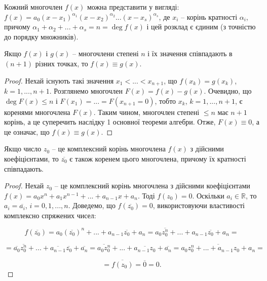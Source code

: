 \begin{corollary}
	Кожний многочлен $f(x)$ можна представити у вигляді:
	$f(x) = a_0(x-x_1)^{\alpha_1}(x-x_2)^{\alpha_2}...(x-x_s)^{\alpha_s}$,
	де $x_i$ -- корінь кратності $\alpha_i$, причому $\alpha_1 + \alpha_2 + ... + \alpha_s = n = \deg f(x)$ і цей розклад
	є єдиним (з точністю до порядку множників).
\end{corollary}

\begin{corollary}
	Якщо $f(x)$ і $g(x)$ -- многочлени степені $n$ і їх значення
	співпадають в $(n+1)$ різних точках, то $f(x) \equiv g(x)$.
\end{corollary}
\begin{proof}
	Нехай існують такі значення $x_1 < ... < x_{n+1}$, що $f(x_k) = g(x_k)$,
	$k = 1, ..., n+1$. Розглянемо многочлен $F(x) = f(x) - g(x)$. Очевидно, що
	$\deg F(x) \leqslant n$ і $F(x_1) = ... = F(x_{n+1} = 0)$, тобто $x_k$, $k = 1, ..., n+1$, є коренями
	многочлена $F(x)$. Таким чином, многочлен степені $\leqslant n$ має $n+1$ корінь, а це
	суперечить наслідку 1 основної теореми алгебри. Отже, $F(x) \equiv 0$, а це означає, що
	$f(x) \equiv g(x)$.
\end{proof}

\begin{corollary}
	Якщо число $z_0$ -- це комплексний корінь многочлена $f(x)$ з
	дійсними коефіцієнтами, то $\overline{z_0}$ є також коренем цього многочлена, причому їх
	кратності співпадають. 
\end{corollary}
\begin{proof}
	Нехай $z_0$ -- це комплексний корінь многочлена з дійсними
	коефіцієнтами $f(x) = a_0x^n + a_1x^{n-1} + ... + a_{n-1}x + a_n$. Тоді $f(z_0) = 0$. Оскільки
	$a_i \in \mathbb{R}$, то $a_i = \overline{a_i}$, $i = 0, 1, ..., n$. Доведемо,
	що $f(\overline{z_0}) = 0$, використовуючи
	властивості комплексно спряжених чисел:
	
	$$f(\overline{z_0}) = a_0(\overline{z_0})^n + ... + a_{n-1}\overline{z_0} + a_n = a_0\overline{z_0^n} + ... + a_{n-1}\overline{z_0} + a_n =$$
	
	$$= \overline{a_0}\overline{z_0^n} + ... + \overline{a_{n-1}}\overline{z_0} + \overline{a_n} = \overline{a_0 z_0^n} + ... + \overline{a_{n-1}z_0} + \overline{a_n} = \overline{a_0z_0^n + ... + a_{n-1}z_0 + a_n} =$$
	
	$$= \overline{f(z_0)} = \overline{0} = 0.$$
\end{proof}

